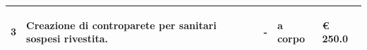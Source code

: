 \documentclass[a4paper]{article}
\begin{document}
\begin{tabular}{ | L{10mm} |  L{86mm} | L{12mm} | L{12mm} | L{16mm} | }
                            
                              \vspace{2.5mm}
                              \begin{spacing}{0}
                           3
                              \end{spacing} &
                              \vspace{2.5mm}
                              \begin{spacing}{0}
                           Creazione di controparete per sanitari sospesi rivestita.
                              \end{spacing} &
                              \vspace{2.5mm}
                              \begin{spacing}{0}
                           -
                              \end{spacing} &
                              \vspace{2.5mm}
                              \begin{spacing}{0}
                           a corpo
                              \end{spacing} &
                              \vspace{2.5mm}
                              \begin{spacing}{0}
                                \euro\hfill 
                            250.0
                              \end{spacing} \\
                              \hline
            
                            
                          \end{tabular}
                          
\end{document}
